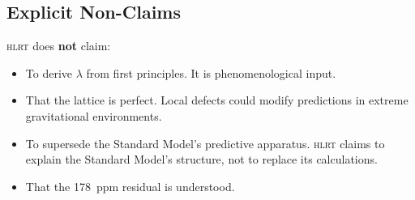 \documentclass[12pt,a4paper]{article}
\theoremstyle{plain}
\theoremstyle{definition}
\newcommand{\HLRT}{\textsc{hlrt}}
\begin{document}
\subsection{Explicit Non-Claims}

\HLRT{} does \textbf{not} claim:
\begin{itemize}[nosep]
    \item To derive $\lambda$ from first principles. It is phenomenological input.
    \item That the lattice is perfect. Local defects could modify predictions in extreme gravitational environments.
    \item To supersede the Standard Model's predictive apparatus. \HLRT{} claims to explain the Standard Model's structure, not to replace its calculations.
    \item That the 178~ppm residual is understood.
\end{itemize}
\end{document}
